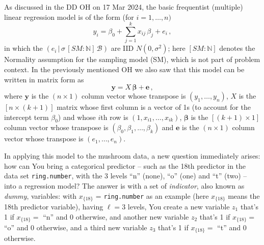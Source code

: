 \documentclass[12pt]{article}
\newcommand{\given}{\, | \,}
\begin{document}
As discussed in the DD OH on 17 Mar 2024, the basic frequentist (multiple) linear regression model is of the form (for $i = 1, \dots, n )$
\begin{equation} \label{e:linear-regression-1}
y_i = \beta_0 + \sum_{ j = 1 }^k x_{ ij } \, \beta_j + e_i \, ,
\end{equation}
in which the $( e_i \given \sigma \, [ SM \! \! : \! \mathbb{ N } ] \, \mathcal{ B } )$ are IID $N ( 0, \sigma^2 )$; here $[ SM \! \! : \! \mathbb{ N } ]$ denotes the Normality assumption for the sampling model (SM), which is not part of problem context. In the previously mentioned OH we also saw that this model can be written in matrix form as
\begin{equation} \label{e:linear-regression-2}
\bm{ y } = X \, \bm{ \beta } + \bm{ e } \, ,
\end{equation} 
where $\bm{ y }$ is the $( n \times 1 )$ column vector whose transpose is $( y_1, \dots, y_n )$, $X$ is the $[ n \times ( k + 1 ) ]$ matrix whose first column is a vector of 1s (to account for the intercept term $\beta_0$) and whose $i$th row is $( 1, x_{ i1 }, \dots, x_{ ik } )$, $\bm{ \beta }$ is the $[ ( k + 1 ) \times 1 ]$ column vector whose transpose is $( \beta_0, \beta_1, \dots, \beta_k )$ and $\bm{ e }$ is the $( n \times 1 )$ column vector whose transpose is $( e_1, \dots, e_n )$. 

In applying this model to the mushroom data, a new question immediately arises: how can You bring a categorical predictor -- such as the 18th predictor in the data set \texttt{ring.number}, with the 3 levels ``n'' (none), ``o'' (one) and ``t'' (two) -- into a regression model? The answer is with a set of \textit{indicator}, also known as \textit{dummy}, variables: with $x_{ \{ 18 \} }$ = \texttt{ring.number} as an example (here $x_{ \{ 18 \} }$ means the 18th predictor variable), having $\ell = 3$ levels, You create a new variable $z_1$ that's 1 if $x_{ \{ 18 \} } =$ ``n'' and 0 otherwise, and another new variable $z_2$ that's 1 if $x_{ \{ 18 \} } =$ ``o'' and 0 otherwise, and a third new variable $z_3$ that's 1 if $x_{ \{ 18 \} } =$ ``t'' and 0 otherwise. 
\end{document}
